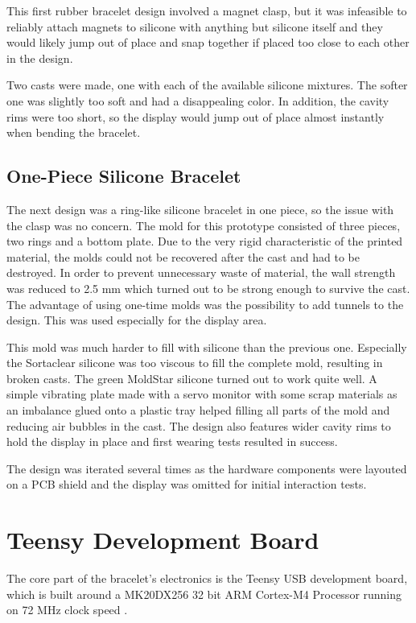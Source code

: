 This first rubber bracelet design involved a magnet clasp, but it was infeasible to reliably attach magnets to silicone with anything but silicone itself and they would likely jump out of place and snap together if placed too close to each other in the design.

Two casts were made, one with each of the available silicone mixtures. The softer one was slightly too soft and had a disappealing color. In addition, the cavity rims were too short, so the display would jump out of place almost instantly when bending the bracelet.

\subsection{One-Piece Silicone Bracelet}
The next design was a ring-like silicone bracelet in one piece, so the issue with the clasp was no concern. The mold for this prototype consisted of three pieces, two rings and a bottom plate. Due to the very rigid characteristic of the printed material, the molds could not be recovered after the cast and had to be destroyed. In order to prevent unnecessary waste of material, the wall strength was reduced to 2.5 mm which turned out to be strong enough to survive the cast. The advantage of using one-time molds was the possibility to add tunnels to the design. This was used especially for the display area.

This mold was much harder to fill with silicone than the previous one. Especially the Sortaclear silicone was too viscous to fill the complete mold, resulting in broken casts. The green MoldStar silicone turned out to work quite well. A simple vibrating plate made with a servo monitor with some scrap materials as an imbalance glued onto a plastic tray helped filling all parts of the mold and reducing air bubbles in the cast. The design also features wider cavity rims to hold the display in place and first wearing tests resulted in success.

The design was iterated several times as the hardware components were layouted on a \ac{PCB} shield and the display was omitted for initial interaction tests.

\section{Teensy Development Board}
The core part of the bracelet's electronics is the Teensy USB development board, which is built around a MK20DX256
32 bit ARM Cortex-M4 Processor running on 72 MHz clock speed \cite{teensy_web}.

